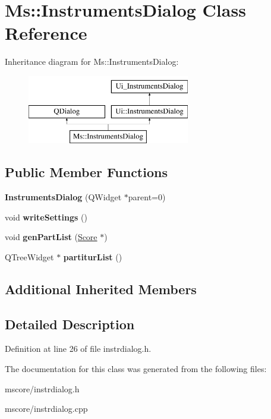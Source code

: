 \hypertarget{class_ms_1_1_instruments_dialog}{}\section{Ms\+:\+:Instruments\+Dialog Class Reference}
\label{class_ms_1_1_instruments_dialog}
Inheritance diagram for Ms\+:\+:Instruments\+Dialog\+:\begin{figure}[H]
\begin{center}
\leavevmode
\includegraphics[height=3.000000cm]{class_ms_1_1_instruments_dialog}
\end{center}
\end{figure}
\subsection*{Public Member Functions}
\begin{DoxyCompactItemize}
\item 
\mbox{\label{class_ms_1_1_instruments_dialog_a2c61277c123d14e33489c1e2e7503ab5}} 
{\bfseries Instruments\+Dialog} (Q\+Widget $\ast$parent=0)
\item 
\mbox{\label{class_ms_1_1_instruments_dialog_ad563e5ef23df5a77b7bee881c59792df}} 
void {\bfseries write\+Settings} ()
\item 
\mbox{\label{class_ms_1_1_instruments_dialog_a6ac0847871fe2d886b4362415c18a385}} 
void {\bfseries gen\+Part\+List} (\hyperlink{class_ms_1_1_score}{Score} $\ast$)
\item 
\mbox{\label{class_ms_1_1_instruments_dialog_a00102f7ea3dd0712b380663073336c06}} 
Q\+Tree\+Widget $\ast$ {\bfseries partitur\+List} ()
\end{DoxyCompactItemize}
\subsection*{Additional Inherited Members}


\subsection{Detailed Description}


Definition at line 26 of file instrdialog.\+h.



The documentation for this class was generated from the following files\+:\begin{DoxyCompactItemize}
\item 
mscore/instrdialog.\+h\item 
mscore/instrdialog.\+cpp\end{DoxyCompactItemize}
